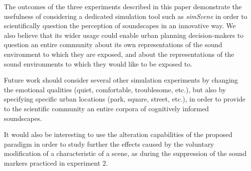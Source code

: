 \documentclass[12pt]{elsarticle}
\newcommand{\etc}{\emph{etc.}}
\begin{document}

The outcomes of the three experiments described in this paper demonstrate the usefulness of considering a dedicated simulation tool such as \emph{simScene} in order to scientifically question the perception of soundscapes in an innovative way. We also believe that its wider usage could enable urban planning decision-makers to question an entire community about its own representations of the sound environment to which they are exposed, and about the representations of the sound environments to which they would like to be exposed to.


Future work should consider several other simulation experiments by changing the emotional qualities (quiet, comfortable, troublesome, etc.), but also by specifying specific urban locations (park, square, street, etc.), in order to provide to the scientific community an entire corpora of cognitively informed soundscapes.


It would also be interesting to use the alteration capabilities of the proposed paradigm in order to study further the effects caused by the voluntary modification of a characteristic of a scene, as during the suppression of the sound markers practiced in experiment 2.

\end{document}
